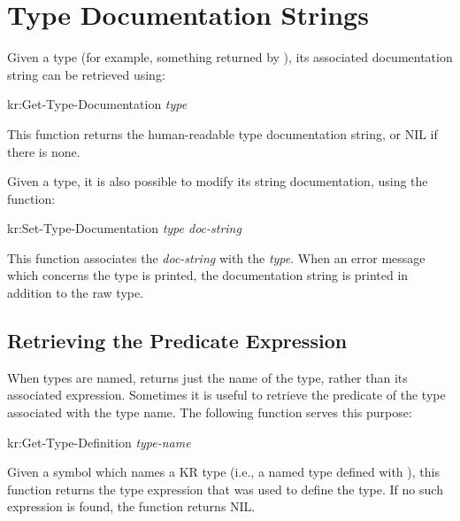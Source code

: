 \section{Type Documentation Strings}


Given a type (for example, something returned by ), its
associated documentation string can be retrieved using:
\begin{example}
kr:Get-Type-Documentation {\it type}	\value{function}
\end{example}

This function returns the human-readable type documentation string, or
NIL if there is none.


Given a type, it is also possible to modify its string documentation,
using the function:
\begin{example}
kr:Set-Type-Documentation {\it type doc-string}	\value{function}
\end{example}

This function associates the {\it doc-string} with the {\it type}.  When
an error message which concerns the type is printed, the documentation
string is printed in addition to the raw type.


\begin{group}
\section{Retrieving the Predicate Expression}

When types are named,  returns just the name of the type, rather
than its associated expression.  Sometimes it is useful to retrieve the
predicate of the type associated with the type name.  The following function
serves this purpose:

\begin{example}
kr:Get-Type-Definition {\it type-name} \value{function}
\end{example}

Given a symbol which names a KR type (i.e., a named type defined with
), this function returns the type expression that was used
to define the type.  If no such expression is found, the function returns NIL.
\end{group}

